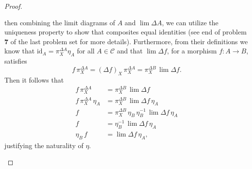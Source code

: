 \documentclass[ 12pt ]{article}
\begin{document}
\begin{enumerate}
\begin{proof}
\begin{center}
			\end{center}
			then combining the limit diagrams of $A$ and $\lim \Delta A$, we can utilize the uniqueness property to show that composites equal identities (see end of problem \textbf{7} of the last problem set for more details). Furthermore, from their definitions we know that $\mathrm{id}_A = \pi_X^{\Delta A} \eta_A$ for all $A \in \mathscr{C}$ and that $\lim \Delta f$, for a morphism $f : A \to B$, satisfies $$f\, \pi_X^{\Delta A} = (\Delta f)_X\, \pi_X^{\Delta A} = \pi_X^{\Delta B}\, \lim \Delta f.$$ Then it follows that
			\begin{align*}
				f\, \pi_X^{\Delta A} &= \pi_X^{\Delta B}\, \lim \Delta f \\
				f\, \pi_X^{\Delta A}\, \eta_A &= \pi_X^{\Delta B}\, \lim \Delta f\, \eta_A \\
				f &= \pi_X^{\Delta B}\, \eta_B\, \eta_B^{-1}\, \lim \Delta f\, \eta_A \\
				f &= \eta_B^{-1}\, \lim \Delta f\, \eta_A \\
				\eta_B\, f &= \lim \Delta f\, \eta_A,
			\end{align*}
			justifying the naturality of $\eta$.
			\begin{center}
			\end{center}
			$ $ \\


\end{proof}
\end{enumerate}
\end{document}
